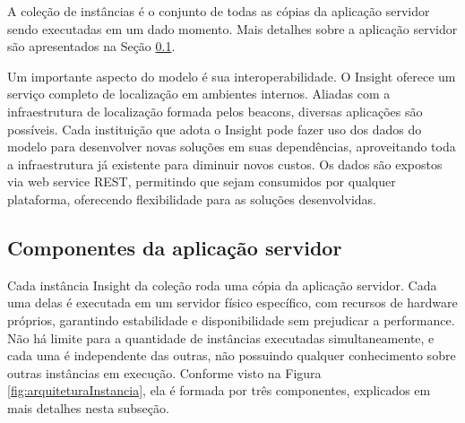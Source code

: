 \documentclass[twoside,english,brazilian]{UNISINOSartigo}
\begin{document}
A coleção de instâncias é o conjunto de todas as cópias da aplicação servidor sendo executadas em um dado momento. Mais detalhes sobre a aplicação servidor são apresentados na Seção \ref{componentesAplicacaoServidor}.

Um importante aspecto do modelo é sua interoperabilidade. O Insight oferece um serviço completo de localização em ambientes internos. Aliadas com a infraestrutura de localização formada pelos beacons, diversas aplicações são possíveis. Cada instituição que adota o Insight pode fazer uso dos dados do modelo para desenvolver novas soluções em suas dependências, aproveitando toda a infraestrutura já existente para diminuir novos custos. Os dados são expostos via web service REST, permitindo que sejam consumidos por qualquer plataforma, oferecendo flexibilidade para as soluções desenvolvidas.

\subsection{Componentes da aplicação servidor}\label{componentesAplicacaoServidor}
Cada instância Insight da coleção roda uma cópia da aplicação servidor. Cada uma delas é executada em um servidor físico específico, com recursos de hardware próprios, garantindo estabilidade e disponibilidade sem prejudicar a performance. Não há limite para a quantidade de instâncias executadas simultaneamente, e cada uma é independente das outras, não possuindo qualquer conhecimento sobre outras instâncias em execução. Conforme visto na Figura \ref{fig:arquiteturaInstancia}, ela é formada por três componentes, explicados em mais detalhes nesta subseção.
\end{document}
